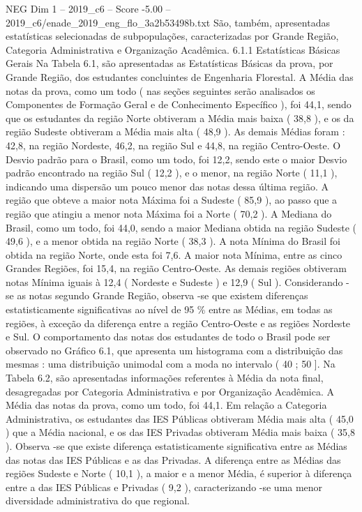 \begin{textsample}{NEG Dim 1 – 2019\_c6 – Score -5.00 – 2019\_c6/enade\_2019\_eng\_flo\_3a2b53498b.txt}
São, também, apresentadas estatísticas selecionadas de subpopulações, caracterizadas por Grande Região, Categoria Administrativa e Organização Acadêmica. 6.1.1 Estatísticas Básicas Gerais Na Tabela 6.1, são apresentadas as Estatísticas Básicas da prova, por Grande Região, dos estudantes concluintes de Engenharia Florestal.
A Média das notas da prova, como um todo ( nas seções seguintes serão analisados os Componentes de Formação Geral e de Conhecimento Específico ), foi 44,1, sendo que os estudantes da região Norte obtiveram a Média mais baixa ( 38,8 ), e os da região Sudeste obtiveram a Média mais alta ( 48,9 ).
As demais Médias foram : 42,8, na região Nordeste, 46,2, na região Sul e 44,8, na região Centro-Oeste.
O Desvio padrão para o Brasil, como um todo, foi 12,2, sendo este o maior Desvio padrão encontrado na região Sul ( 12,2 ), e o menor, na região Norte ( 11,1 ), indicando uma dispersão um pouco menor das notas dessa última região.
A região que obteve a maior nota Máxima foi a Sudeste ( 85,9 ), ao passo que a região que atingiu a menor nota Máxima foi a Norte ( 70,2 ).
A Mediana do Brasil, como um todo, foi 44,0, sendo a maior Mediana obtida na região Sudeste ( 49,6 ), e a menor obtida na região Norte ( 38,3 ).
A nota Mínima do Brasil foi obtida na região Norte, onde esta foi 7,6.
A maior nota Mínima, entre as cinco Grandes Regiões, foi 15,4, na região Centro-Oeste.
As demais regiões obtiveram notas Mínima iguais à 12,4 ( Nordeste e Sudeste ) e 12,9 ( Sul ).
Considerando -se as notas segundo Grande Região, observa -se que existem diferenças estatisticamente significativas ao nível de 95 \% entre as Médias, em todas as regiões, à exceção da diferença entre a região Centro-Oeste e as regiões Nordeste e Sul.
O comportamento das notas dos estudantes de todo o Brasil pode ser observado no Gráfico 6.1, que apresenta um histograma com a distribuição das mesmas : uma distribuição unimodal com a moda no intervalo ( 40 ; 50 ].
Na Tabela 6.2, são apresentadas informações referentes à Média da nota final, desagregadas por Categoria Administrativa e por Organização Acadêmica.
A Média das notas da prova, como um todo, foi 44,1.
Em relação a Categoria Administrativa, os estudantes das IES Públicas obtiveram Média mais alta ( 45,0 ) que a Média nacional, e os das IES Privadas obtiveram Média mais baixa ( 35,8 ).
Observa -se que existe diferença estatisticamente significativa entre as Médias das notas das IES Públicas e as das Privadas.
A diferença entre as Médias das regiões Sudeste e Norte ( 10,1 ), a maior e a menor Média, é superior à diferença entre a das IES Públicas e Privadas ( 9,2 ), caracterizando -se uma menor diversidade administrativa do que regional.

\end{textsample}

